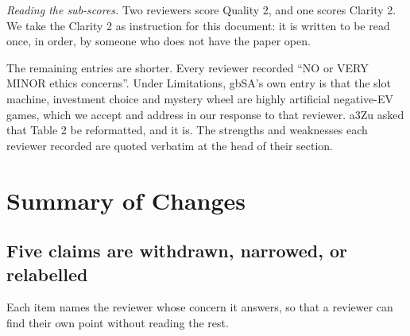 \documentclass[11pt]{article}
\begin{document}
\noindent
\textit{Reading the sub-scores.} Two reviewers score Quality 2, and one scores Clarity 2. We take
the Clarity 2 as instruction for this document: it is written to be read once, in order, by
someone who does not have the paper open.

The remaining entries are shorter. Every reviewer recorded ``NO or VERY MINOR ethics concerns''.
Under Limitations, gbSA's own entry is that the slot machine, investment choice and mystery wheel
are highly artificial negative-EV games, which we accept and address in our response to that
reviewer. a3Zu asked that Table 2 be reformatted, and it is. The strengths and weaknesses each
reviewer recorded are quoted verbatim at the head of their section.

\section*{Summary of Changes}

\subsection*{Five claims are withdrawn, narrowed, or relabelled}

Each item names the reviewer whose concern it answers, so that a reviewer can find their own
point without reading the rest.
\end{document}
